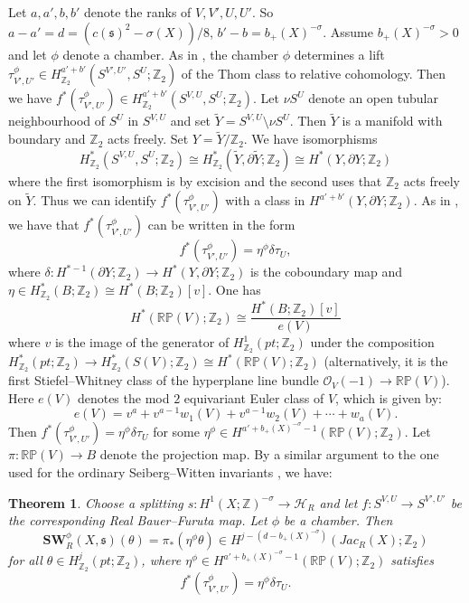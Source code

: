 \documentclass{amsart}
\newtheorem{theorem}{Theorem}[section]
\theoremstyle{definition}
\theoremstyle{remark}
\numberwithin{equation}{section}
\begin{document}
Let $a,a',b,b'$ denote the ranks of $V,V',U,U'$. So $a-a' = d = (c(\mathfrak{s})^2 - \sigma(X))/8$, $b' - b = b_+(X)^{-\sigma}$. Assume $b_+(X)^{-\sigma} > 0$ and let $\phi$ denote a chamber. As in \cite[]{bk}, the chamber $\phi$ determines a lift $\tau^\phi_{V',U'} \in H^{a'+b'}_{\mathbb{Z}_2}( S^{V',U'} , S^{U} ; \mathbb{Z}_2)$ of the Thom class to relative cohomology. Then we have $f^*( \tau^{\phi}_{V',U'}) \in H^{a'+b'}_{\mathbb{Z}_2}( S^{V,U} , S^U ; \mathbb{Z}_2)$. Let $\nu S^U$ denote an open tubular neighbourhood of $S^U$ in $S^{V,U}$ and set $\widetilde{Y} = S^{V,U} \setminus \nu S^U$. Then $\widetilde{Y}$ is a manifold with boundary and $\mathbb{Z}_2$ acts freely. Set $Y = \widetilde{Y}/\mathbb{Z}_2$. We have isomorphisms
\[
H^*_{\mathbb{Z}_2}( S^{V,U} , S^U ; \mathbb{Z}_2) \cong H^*_{\mathbb{Z}_2}( \widetilde{Y} , \partial \widetilde{Y} ; \mathbb{Z}_2) \cong H^*(Y , \partial Y ; \mathbb{Z}_2)
\]
where the first isomorphism is by excision and the second uses that $\mathbb{Z}_2$ acts freely on $\widetilde{Y}$. Thus we can identify $f^*(\tau^\phi_{V',U'})$ with a class in $H^{a'+b'}(Y , \partial Y ; \mathbb{Z}_2)$. As in \cite{bk}, we have that $f^*(\tau^{\phi}_{V',U'})$ can be written in the form
\[
f^*( \tau^\phi_{V',U'}) = \eta^\phi \delta \tau_U,
\]
where $\delta : H^{*-1}(\partial Y ; \mathbb{Z}_2) \to H^*(Y , \partial Y ; \mathbb{Z}_2)$ is the coboundary map and $\eta \in H^*_{\mathbb{Z}_2}(B ; \mathbb{Z}_2) \cong H^*(B ; \mathbb{Z}_2)[v]$. One has
\[
H^*( \mathbb{RP}(V) ; \mathbb{Z}_2) \cong \frac{H^*(B ; \mathbb{Z}_2)[v]}{e(V)}
\]
where $v$ is the image of the generator of $H^1_{\mathbb{Z}_2}(pt ; \mathbb{Z}_2)$ under the composition $H^*_{\mathbb{Z}_2}(pt ; \mathbb{Z}_2) \to H^*_{\mathbb{Z}_2}( S(V) ; \mathbb{Z}_2) \cong H^*( \mathbb{RP}(V) ; \mathbb{Z}_2)$ (alternatively, it is the first Stiefel--Whitney class of the hyperplane line bundle $\mathcal{O}_V(-1) \to \mathbb{RP}(V)$). Here $e(V)$ denotes the mod $2$ equivariant Euler class of $V$, which is given by:
\[
e(V) = v^a + v^{a-1} w_1(V) + v^{a-1} w_2(V) + \cdots + w_a(V).
\]
Then $f^*(\tau^\phi_{V',U'}) = \eta^\phi \delta \tau_U$ for some $\eta^\phi \in H^{a'+b_+(X)^{-\sigma} - 1}( \mathbb{RP}(V) ; \mathbb{Z}_2 )$. Let $\pi : \mathbb{RP}(V) \to B$ denote the projection map. By a similar argument to the one used for the ordinary Seiberg--Witten invariants \cite{bk}, we have:

\begin{theorem}
Choose a splitting $s : H^1(X ; \mathbb{Z})^{-\sigma} \to \mathcal{H}_R$ and let $f : S^{V,U} \to S^{V',U'}$ be the corresponding Real Bauer--Furuta map. Let $\phi$ be a chamber. Then
\[
\mathbf{SW}_R^\phi(X , \mathfrak{s})(\theta) = \pi_*( \eta^\phi \theta ) \in H^{j  - (d-b_+(X)^{-\sigma})}( Jac_R(X) ; \mathbb{Z}_2)
\]
for all $\theta \in H^j_{\mathbb{Z}_2}( pt ; \mathbb{Z}_2)$, where $\eta^\phi \in H^{a'+b_+(X)^{-\sigma}-1}( \mathbb{RP}(V) ; \mathbb{Z}_2)$ satisfies
\[
f^*( \tau^\phi_{V',U'} ) = \eta^\phi \delta \tau_U.
\]
\end{theorem}
\end{document}

